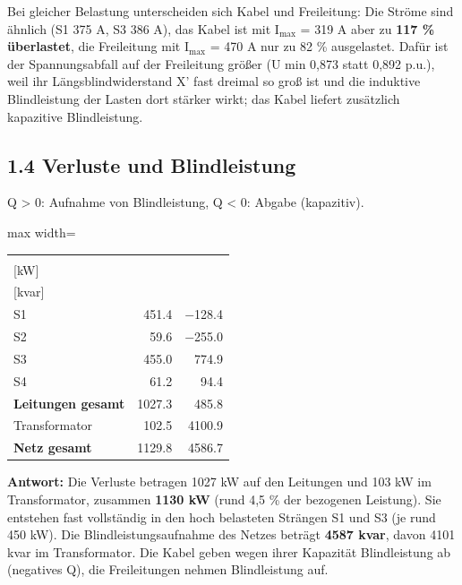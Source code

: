 \documentclass[11pt,a4paper]{article}
\begin{document}
Bei gleicher Belastung unterscheiden sich Kabel und Freileitung: Die Ströme sind ähnlich (S1 375 A, S3 386 A), das Kabel ist mit I$_\mathrm{max}$ = 319 A aber zu \textbf{117 \% überlastet}, die Freileitung mit I$_\mathrm{max}$ = 470 A nur zu 82 \% ausgelastet. Dafür ist der Spannungsabfall auf der Freileitung größer (U min 0,873 statt 0,892 p.u.), weil ihr Längsblindwiderstand X' fast dreimal so groß ist und die induktive Blindleistung der Lasten dort stärker wirkt; das Kabel liefert zusätzlich kapazitive Blindleistung.

\subsection{1.4 Verluste und Blindleistung}

Q > 0: Aufnahme von Blindleistung, Q < 0: Abgabe (kapazitiv).

\begin{table}[H]
\centering
\begin{adjustbox}{max width=\linewidth}
\begin{tabular}{lrr}
\toprule
\textbf{} & \thead{P$_\mathrm{V}$ \\ {[kW]}} & \thead{Q$_\mathrm{V}$ \\ {[kvar]}} \\
\midrule
S1 & 451.4 & $-$128.4 \\
S2 & 59.6 & $-$255.0 \\
S3 & 455.0 & 774.9 \\
S4 & 61.2 & 94.4 \\
\textbf{Leitungen gesamt} & 1027.3 & 485.8 \\
Transformator & 102.5 & 4100.9 \\
\textbf{Netz gesamt} & 1129.8 & 4586.7 \\
\bottomrule
\end{tabular}
\end{adjustbox}
\end{table}

\textbf{Antwort:} Die Verluste betragen 1027 kW auf den Leitungen und 103 kW im Transformator, zusammen \textbf{1130 kW} (rund 4,5 \% der bezogenen Leistung). Sie entstehen fast vollständig in den hoch belasteten Strängen S1 und S3 (je rund 450 kW). Die Blindleistungsaufnahme des Netzes beträgt \textbf{4587 kvar}, davon 4101 kvar im Transformator. Die Kabel geben wegen ihrer Kapazität Blindleistung ab (negatives Q), die Freileitungen nehmen Blindleistung auf.

\clearpage
\end{document}
